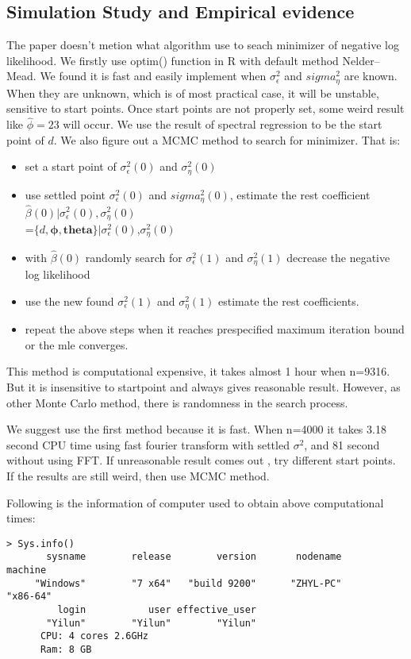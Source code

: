 \documentclass[10pt,a4paper]{article}
\begin{document}
\subsection{Simulation Study and Empirical evidence}
The paper doesn't metion what algorithm use to seach minimizer of negative log likelihood. We firstly use optim() function in R with default method Nelder–Mead. We found it is fast and easily implement when $\sigma_\epsilon^2$ and $sigma_\eta^2$ are known. When they are unknown, which is of most practical case, it will be unstable, sensitive to start points. Once start points are not properly set, some weird result like $\hat{\phi}=23$ will occur. We use the result of spectral regression to be the start point of $d$. We also figure out a MCMC method to search for minimizer. That is: 
\begin{itemize}
\item{set a start point of $\sigma_\epsilon^2(0)$ and $\sigma_\eta^2(0)$}
\item{ use settled point $\sigma_\epsilon^2(0)$ and $sigma_\eta^2(0)$, estimate the rest coefficient $\hat{\beta}(0)|\sigma_\epsilon^2(0),\sigma_\eta^2(0)$\\=$\{d,\bm{\phi},\bm{theta}\}|\sigma_\epsilon^2(0)$,$\sigma_\eta^2(0)$}
\item{with $\hat{\beta}(0)$ randomly search for $\sigma_\epsilon^2(1)$ and $\sigma_\eta^2(1)$ decrease the negative log likelihood}
\item{use the new found $\sigma_\epsilon^2(1)$ and $\sigma_\eta^2(1)$ estimate the rest coefficients.}
\item{repeat the above steps when it reaches prespecified maximum iteration bound or the mle converges.}
\end{itemize}

This method is computational expensive, it takes almost 1 hour when n=9316. But it is insensitive to startpoint and always gives reasonable result. However, as other Monte Carlo method, there is randomness in the search process.

We suggest use the first method because it is fast. When n=4000 it takes 3.18 second CPU time using fast fourier transform with settled $\sigma^2$, and 81 second without using FFT. If unreasonable result comes out , try different start points. If the results are still weird, then use MCMC method.

Following is the information of computer used to obtain above computational times:
\begin{verbatim}
> Sys.info()
       sysname        release        version       nodename        machine 
     "Windows"        "7 x64"   "build 9200"      "ZHYL-PC"       "x86-64" 
         login           user effective_user 
       "Yilun"        "Yilun"        "Yilun"
      CPU: 4 cores 2.6GHz 
      Ram: 8 GB      
\end{verbatim}
\end{document}

